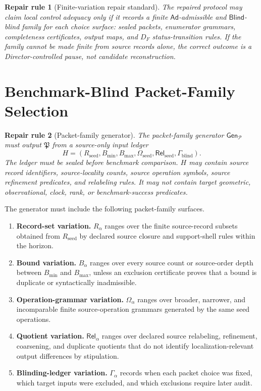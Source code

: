 \documentclass[11pt]{article}
\newcommand{\Pack}{\mathcal{P}}
\newcommand{\PackFam}{\mathfrak{P}}
\newcommand{\Rel}{\mathsf{Rel}}
\newcommand{\GammaB}{\Gamma}
\newcommand{\Ad}{\mathsf{Ad}}
\newcommand{\Blind}{\mathsf{Blind}}
\newtheorem{repairrule}{Repair rule}
\begin{document}
\begin{repairrule}[Finite-variation repair standard]
The repaired protocol may claim local control adequacy only if it records a
finite \(\Ad\)-admissible and \(\Blind\)-blind family for each choice surface:
sealed packets, enumerator grammars, completeness certificates, output maps,
and \(D_F\) status-transition rules. If the family cannot be made finite from
source records alone, the correct outcome is a Director-controlled pause, not
candidate reconstruction.
\end{repairrule}

\section{Benchmark-Blind Packet-Family Selection}

\begin{repairrule}[Packet-family generator]
The packet-family generator \(\mathsf{Gen}_{\Pack}\) must output
\(\PackFam\) from a source-only input ledger
\[
H=(R_{\mathrm{seed}},B_{\min},B_{\max},\Omega_{\mathrm{seed}},
\Rel_{\mathrm{seed}},\Gamma_{\mathrm{blind}}).
\]
The ledger must be sealed before benchmark comparison. \(H\) may contain
source record identifiers, source-locality counts, source operation symbols,
source refinement predicates, and relabeling rules. It may not contain target
geometric, observational, clock, rank, or benchmark-success predicates.
\end{repairrule}

The generator must include the following packet-family surfaces.
\begin{enumerate}
    \item \textbf{Record-set variation.} \(R_\alpha\) ranges over the finite
    source-record subsets obtained from \(R_{\mathrm{seed}}\) by declared
    source closure and support-shell rules within the horizon.
    \item \textbf{Bound variation.} \(B_\alpha\) ranges over every source
    count or source-order depth between \(B_{\min}\) and \(B_{\max}\), unless
    an exclusion certificate proves that a bound is duplicate or syntactically
    inadmissible.
    \item \textbf{Operation-grammar variation.} \(\Omega_\alpha\) ranges over
    broader, narrower, and incomparable finite source-operation grammars
    generated by the same seed operations.
    \item \textbf{Quotient variation.} \(\Rel_\alpha\) ranges over declared
    source relabeling, refinement, coarsening, and duplicate quotients that do
    not identify localization-relevant output differences by stipulation.
    \item \textbf{Blinding-ledger variation.} \(\GammaB_\alpha\) records when
    each packet choice was fixed, which target inputs were excluded, and which
    exclusions require later audit.
\end{enumerate}
\end{document}
